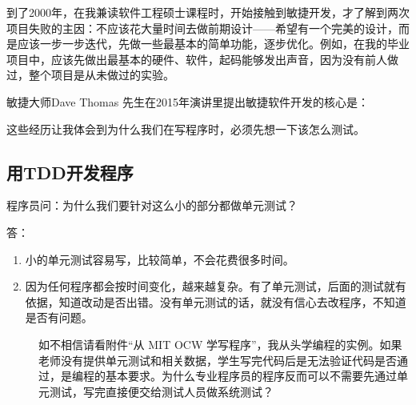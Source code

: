 到了2000年，在我兼读软件工程硕士课程时，开始接触到敏捷开发，才了解到两次项目失败的主因：不应该花大量时间去做前期设计------希望有一个完美的设计，而是应该一步一步迭代，先做一些最基本的简单功能，逐步优化。例如，在我的毕业项目中，应该先做出最基本的硬件、软件，起码能够发出声音，因为没有前人做过，整个项目是从未做过的实验。

敏捷大师Dave Thomas 先生在2015年演讲里提出敏捷软件开发的核心是：



这些经历让我体会到为什么我们在写程序时，必须先想一下该怎么测试。

\hypertarget{ux7528tddux5f00ux53d1ux7a0bux5e8f}{%
\subsection{用TDD开发程序}\label{ux7528tddux5f00ux53d1ux7a0bux5e8f}}

程序员问：为什么我们要针对这么小的部分都做单元测试？

答：

\begin{enumerate}
\tightlist
\item
  小的单元测试容易写，比较简单，不会花费很多时间。
\item
  因为任何程序都会按时间变化，越来越复杂。有了单元测试，后面的测试就有依据，知道改动是否出错。没有单元测试的话，就没有信心去改程序，不知道是否有问题。
\end{enumerate}

\begin{description}
\item[]

如不相信请看附件“从 MIT OCW 学写程序”，我从头学编程的实例。如果老师没有提供单元测试和相关数据，学生写完代码后是无法验证代码是否通过，是编程的基本要求。为什么专业程序员的程序反而可以不需要先通过单元测试，写完直接便交给测试人员做系统测试？
\end{description}


